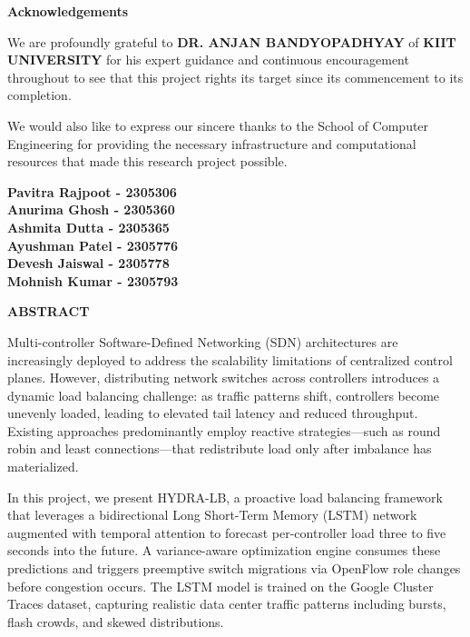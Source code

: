 \documentclass[12pt,a4paper]{report}
\begin{document}
\newpage
\thispagestyle{empty}
\begin{center}
{\Large \textbf{Acknowledgements}}\\[1cm]
\end{center}

We are profoundly grateful to \textbf{DR. ANJAN BANDYOPADHYAY} of \textbf{KIIT UNIVERSITY} for his expert guidance and continuous encouragement throughout to see that this project rights its target since its commencement to its completion.

We would also like to express our sincere thanks to the School of Computer Engineering for providing the necessary infrastructure and computational resources that made this research project possible.

\vspace{1cm}
\noindent\textbf{Pavitra Rajpoot - 2305306}\\
\textbf{Anurima Ghosh - 2305360}\\
\textbf{Ashmita Dutta - 2305365}\\
\textbf{Ayushman Patel - 2305776}\\
\textbf{Devesh Jaiswal - 2305778}\\
\textbf{Mohnish Kumar - 2305793}

\newpage
\thispagestyle{empty}
\begin{center}
{\Large \textbf{ABSTRACT}}\\[1cm]
\end{center}

Multi-controller Software-Defined Networking (SDN) architectures are increasingly deployed to address the scalability limitations of centralized control planes. However, distributing network switches across controllers introduces a dynamic load balancing challenge: as traffic patterns shift, controllers become unevenly loaded, leading to elevated tail latency and reduced throughput. Existing approaches predominantly employ reactive strategies---such as round robin and least connections---that redistribute load only after imbalance has materialized.

In this project, we present HYDRA-LB, a proactive load balancing framework that leverages a bidirectional Long Short-Term Memory (LSTM) network augmented with temporal attention to forecast per-controller load three to five seconds into the future. A variance-aware optimization engine consumes these predictions and triggers preemptive switch migrations via OpenFlow role changes before congestion occurs. The LSTM model is trained on the Google Cluster Traces dataset, capturing realistic data center traffic patterns including bursts, flash crowds, and skewed distributions.
\end{document}
